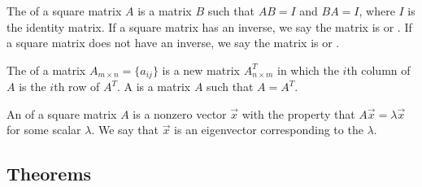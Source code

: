 \begin{definition}[Inverse] 
%
The  of a square matrix $A$ is a matrix $B$ such that $AB=I$ and $BA=I$, where $I$ is the identity matrix.   If a square matrix has an inverse, we say the matrix is  or .  If a square matrix does not have an inverse, we say the matrix is  or .
\end{definition}

\begin{definition}
%
The  of a matrix $A_{m\times n}=\{a_{ij}\}$ is a new matrix $A^T_{n\times m}$ in which the $i$th column of $A$ is the $i$th row of $A^T$.  A  is a matrix $A$ such that $A=A^T$.
\end{definition}


\begin{definition} 
%
An  of a square matrix $A$ is a nonzero vector $\vec x$ with the property that $A\vec x = \lambda \vec x$ for some scalar $\lambda$.  We say that $\vec x$ is an eigenvector corresponding to the  $\lambda$. 
\end{definition}























\subsection{Theorems}

